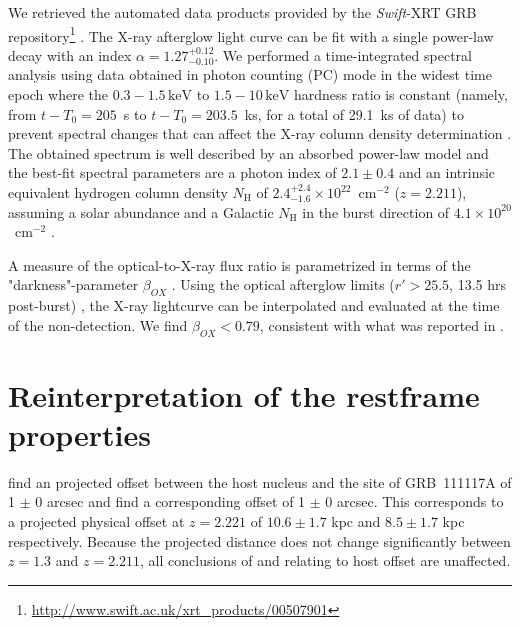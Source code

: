 \documentclass{aa}    %
\begin{document}
We retrieved the automated data products provided by the \textit{Swift}-XRT GRB
repository\footnote{\url{http://www.swift.ac.uk/xrt\_products/00507901}}
\citep{Evans2009}. 
The X-ray afterglow light curve can be fit with a single power-law decay with an
index $\alpha=1.27_{-0.10}^{+0.12}$. We performed a time-integrated spectral
analysis using data obtained in photon counting (PC) mode in the widest time epoch where
the $0.3-1.5\,\mathrm{keV}$ to $1.5-10\,\mathrm{keV}$ hardness ratio is constant
(namely, from $t-T_0 = 205$~s to $t-T_0 = 203.5$~ks, for a total of 29.1~ks of
data) to prevent spectral changes that can affect the X-ray column density
determination \citep{Kopac2012}. 
The obtained spectrum is well described by an absorbed power-law
model and the best-fit spectral parameters are a photon index of $2.1 \pm 0.4$ and
an intrinsic equivalent hydrogen column density $N_{\mathrm{H}}$ of $2.4_{-1.6}^{+2.4}
\times 10^{22}$~cm$^{-2}$ ($z=2.211$), assuming a solar abundance and a Galactic $N_{\mathrm{H}}$ in
the burst direction of $4.1 \times 10^{20}$~cm$^{-2}$ \citep{Willingale2013}.

A measure of the optical-to-X-ray flux ratio is parametrized in terms of the
"darkness"-parameter $\beta_{OX} $ \citep{Jakobsson2004}. Using the optical
afterglow limits ($r' > 25.5$, 13.5 hrs post-burst) \citep{Cucchiara2011,
	Cenko2011}, the X-ray lightcurve can be interpolated and evaluated at the time
of the non-detection. We find $\beta_{OX} < 0.79$, consistent with what was
reported in \citet{Sakamoto2013}.

\section{Reinterpretation of the restframe properties}

\citet{Margutti2012} find an projected offset between the host nucleus and the
site of GRB~111117A of 1 $\pm$ 0 arcsec and \citet{Sakamoto2013}
find a corresponding offset of 1 $\pm$ 0 arcsec. This corresponds
to a projected physical offset at $z = 2.221$ of $10.6 \pm 1.7$ kpc and $8.5 \pm
1.7$ kpc respectively. Because the projected distance does not change
significantly between $z = 1.3$ and $z = 2.211$, all conclusions of
\citet{Margutti2012} and \citet{Sakamoto2013} relating to host offset are
unaffected.

\end{document}
